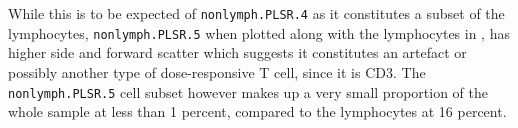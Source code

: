 While this is to be expected of \texttt{nonlymph.PLSR.4} as it constitutes a subset of the lymphocytes, \texttt{nonlymph.PLSR.5} when plotted along with the lymphocytes in , has higher side and forward scatter which suggests it constitutes an artefact or possibly another type of dose-responsive T cell, since it is CD3\positive.
The \texttt{nonlymph.PLSR.5} cell subset however makes up a very small proportion of the whole sample at less than 1 percent, compared to the lymphocytes at 16 percent.  

%
